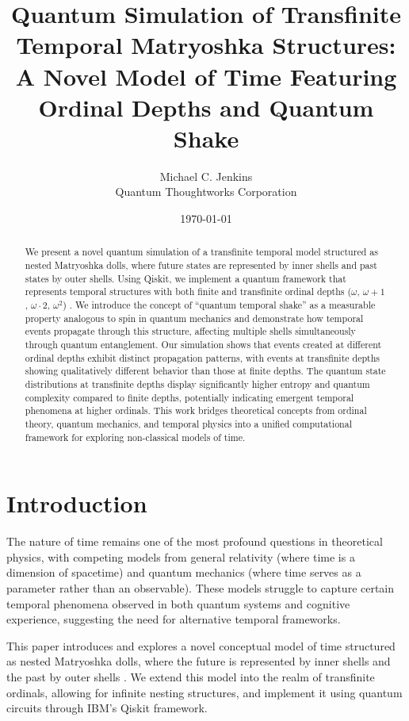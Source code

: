 \documentclass[12pt,a4paper]{article}
\title{Quantum Simulation of Transfinite Temporal Matryoshka Structures: A Novel Model of Time Featuring Ordinal Depths and Quantum Shake}
\author{Michael C. Jenkins\\
Quantum Thoughtworks Corporation}
\date{\today}
\begin{document}
\maketitle

\begin{abstract}
We present a novel quantum simulation of a transfinite temporal model structured as nested Matryoshka dolls, where future states are represented by inner shells and past states by outer shells. Using Qiskit, we implement a quantum framework that represents temporal structures with both finite and transfinite ordinal depths ($\omega$, $\omega+1$, $\omega \cdot 2$, $\omega^2$) \citep{matryoshka}. We introduce the concept of ``quantum temporal shake'' as a measurable property analogous to spin in quantum mechanics and demonstrate how temporal events propagate through this structure, affecting multiple shells simultaneously through quantum entanglement. Our simulation shows that events created at different ordinal depths exhibit distinct propagation patterns, with events at transfinite depths showing qualitatively different behavior than those at finite depths. The quantum state distributions at transfinite depths display significantly higher entropy and quantum complexity compared to finite depths, potentially indicating emergent temporal phenomena at higher ordinals. This work bridges theoretical concepts from ordinal theory, quantum mechanics, and temporal physics into a unified computational framework for exploring non-classical models of time.
\end{abstract}

\section{Introduction}

The nature of time remains one of the most profound questions in theoretical physics, with competing models from general relativity (where time is a dimension of spacetime) and quantum mechanics (where time serves as a parameter rather than an observable). These models struggle to capture certain temporal phenomena observed in both quantum systems \citep{zurek} and cognitive experience, suggesting the need for alternative temporal frameworks.

This paper introduces and explores a novel conceptual model of time structured as nested Matryoshka dolls, where the future is represented by inner shells and the past by outer shells \citep{matryoshka}. We extend this model into the realm of transfinite ordinals, allowing for infinite nesting structures, and implement it using quantum circuits through IBM's Qiskit framework.
\end{document}
